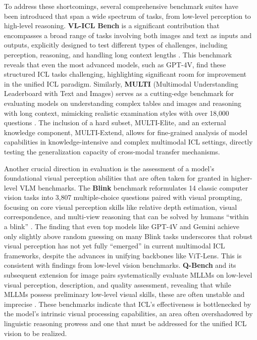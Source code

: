 \documentclass[11pt]{article}
\begin{document}
To address these shortcomings, several comprehensive benchmark suites have been introduced that span a wide spectrum of tasks, from low-level perception to high-level reasoning. \textbf{VL-ICL Bench} is a significant contribution that encompasses a broad range of tasks involving both images and text as inputs and outputs, explicitly designed to test different types of challenges, including perception, reasoning, and handling long context lengths \cite{ref13}. This benchmark reveals that even the most advanced models, such as GPT-4V, find these structured ICL tasks challenging, highlighting significant room for improvement in the unified ICL paradigm. Similarly, \textbf{MULTI} (Multimodal Understanding Leaderboard with Text and Images) serves as a cutting-edge benchmark for evaluating models on understanding complex tables and images and reasoning with long context, mimicking realistic examination styles with over 18,000 questions \cite{ref298}. The inclusion of a hard subset, MULTI-Elite, and an external knowledge component, MULTI-Extend, allows for fine-grained analysis of model capabilities in knowledge-intensive and complex multimodal ICL settings, directly testing the generalization capacity of cross-modal transfer mechanisms.

Another crucial direction in evaluation is the assessment of a model's foundational visual perception abilities that are often taken for granted in higher-level VLM benchmarks. The \textbf{Blink} benchmark reformulates 14 classic computer vision tasks into 3,807 multiple-choice questions paired with visual prompting, focusing on core visual perception skills like relative depth estimation, visual correspondence, and multi-view reasoning that can be solved by humans ``within a blink'' \cite{ref299}. The finding that even top models like GPT-4V and Gemini achieve only slightly above random guessing on many Blink tasks underscores that robust visual perception has not yet fully ``emerged'' in current multimodal ICL frameworks, despite the advances in unifying backbones like ViT-Lens. This is consistent with findings from low-level vision benchmarks. \textbf{Q-Bench} and its subsequent extension for image pairs systematically evaluate MLLMs on low-level visual perception, description, and quality assessment, revealing that while MLLMs possess preliminary low-level visual skills, these are often unstable and imprecise \cite{ref300,ref301}. These benchmarks indicate that ICL's effectiveness is bottlenecked by the model's intrinsic visual processing capabilities, an area often overshadowed by linguistic reasoning prowess and one that must be addressed for the unified ICL vision to be realized.
\end{document}
